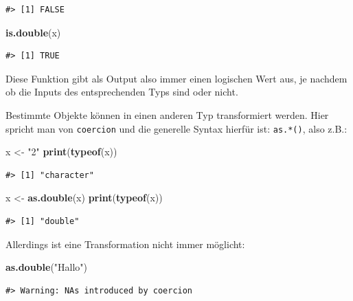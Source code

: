 \documentclass[]{tufte-book}
\newenvironment{Shaded}{}{}
\newcommand{\KeywordTok}[1]{\textcolor[rgb]{0.00,0.44,0.13}{\textbf{#1}}}
\newcommand{\StringTok}[1]{\textcolor[rgb]{0.25,0.44,0.63}{#1}}
\newcommand{\NormalTok}[1]{#1}
\begin{document}
\begin{verbatim}
#> [1] FALSE
\end{verbatim}

\begin{Shaded}
\begin{Highlighting}[]
\KeywordTok{is.double}\NormalTok{(x)}
\end{Highlighting}
\end{Shaded}

\begin{verbatim}
#> [1] TRUE
\end{verbatim}

Diese Funktion gibt als Output also immer einen logischen Wert aus, je
nachdem ob die Inputs des entsprechenden Typs sind oder nicht.

Bestimmte Objekte können in einen anderen Typ transformiert werden. Hier
spricht man von \texttt{coercion} und die generelle Syntax hierfür ist:
\texttt{as.*()}, also z.B.:

\begin{Shaded}
\begin{Highlighting}[]
\NormalTok{x <-}\StringTok{ "2"}
\KeywordTok{print}\NormalTok{(}\KeywordTok{typeof}\NormalTok{(x))}
\end{Highlighting}
\end{Shaded}

\begin{verbatim}
#> [1] "character"
\end{verbatim}

\begin{Shaded}
\begin{Highlighting}[]
\NormalTok{x <-}\StringTok{ }\KeywordTok{as.double}\NormalTok{(x)}
\KeywordTok{print}\NormalTok{(}\KeywordTok{typeof}\NormalTok{(x))}
\end{Highlighting}
\end{Shaded}

\begin{verbatim}
#> [1] "double"
\end{verbatim}

Allerdings ist eine Transformation nicht immer möglicht:

\begin{Shaded}
\begin{Highlighting}[]
\KeywordTok{as.double}\NormalTok{(}\StringTok{"Hallo"}\NormalTok{)}
\end{Highlighting}
\end{Shaded}

\begin{verbatim}
#> Warning: NAs introduced by coercion
\end{verbatim}
\end{document}
